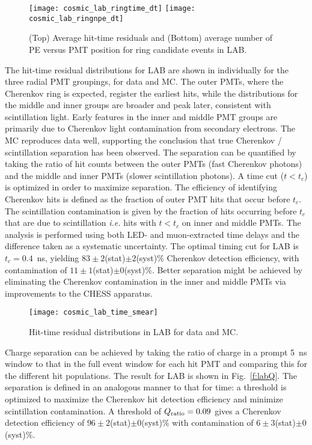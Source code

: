 \begin{figure}[!t]
	\centering
	\texttt{[image: cosmic\_lab\_ringtime\_dt]}
	\texttt{[image: cosmic\_lab\_ringnpe\_dt]}
	\caption{(Top) Average hit-time residuals and (Bottom) average number of PE versus PMT position for ring candidate events in LAB.}
	\label{fig:lab2}
\end{figure}



The hit-time residual distributions for LAB are shown in  individually for the three radial PMT groupings, for data and MC. The outer PMTs, where the Cherenkov ring is expected, register the earliest hits, while the distributions for the middle and inner groups are broader and peak later, consistent with scintillation light. Early features  in the inner and middle PMT groups are primarily due to Cherenkov light contamination from secondary electrons.  
The MC reproduces data well, supporting the conclusion that true Cherenkov / scintillation separation has been observed.  
The separation can be quantified by taking the ratio of hit counts between the outer PMTs (fast Cherenkov photons) and the middle and inner PMTs (slower scintillation photons).  
A time cut ($t < t_c$) is optimized in order to maximize separation.  
The efficiency of identifying Cherenkov hits is defined as the fraction of outer PMT hits that occur before $t_c$.  
The scintillation contamination  is given by the fraction of hits  occurring before $t_c$ that are due to scintillation {\it i.e.}  hits with $t < t_c$ on inner and middle PMTs. 
The analysis is performed using both LED- and muon-extracted time delays and the difference taken as a systematic uncertainty. 
The optimal timing cut for LAB is $ t_c = 0.4$~ns,  yielding $83\pm2$(stat)$\pm2$(syst)\% Cherenkov detection efficiency, with contamination of  
$11\pm1$(stat)$\pm0$(syst)\%. Better separation might be achieved by eliminating the  Cherenkov contamination in the inner and middle PMTs via improvements to the CHESS apparatus.

\begin{figure}
	\centering
	\texttt{[image: cosmic\_lab\_time\_smear]}
	\caption{Hit-time residual distributions in LAB for data and MC.}
	\label{fig:lab}
\end{figure}

Charge separation can be achieved by taking the ratio of charge in a prompt 5~ns window to that in the full event window for each hit PMT  and comparing this for the different hit populations.  
The result for LAB is shown in Fig.~\ref{f:labQ}.  The separation is defined in an analogous manner to that for time: a threshold is optimized to maximize the Cherenkov hit detection efficiency and minimize scintillation contamination.  
A threshold of $Q_{\rm ratio}=0.09$ gives a Cherenkov detection efficiency of $96\pm2$(stat)$\pm0$(syst)\% with contamination of $6\pm3$(stat)$\pm0$(syst)\%.

